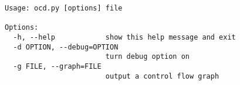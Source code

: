 \begin{verbatim}
Usage: ocd.py [options] file

Options:
  -h, --help            show this help message and exit
  -d OPTION, --debug=OPTION
                        turn debug option on
  -g FILE, --graph=FILE
                        output a control flow graph
\end{verbatim}
